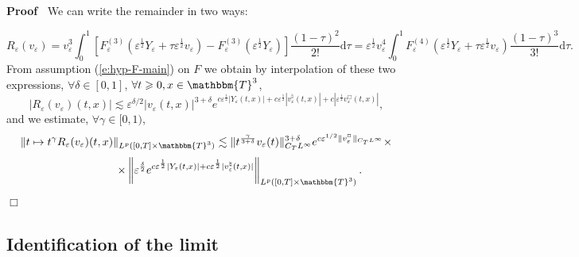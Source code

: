\documentclass[a4paper,11pt]{article}
\newcommand{\mathd}{\mathrm{d}}
\newenvironment{proof}{\noindent\textbf{Proof\ }}{\hspace*{\fill}$\Box$\medskip}
\begin{document}
\begin{proof}
  We can write the remainder in two ways:
  
  
  \[ R_{\varepsilon} (v_{\varepsilon}) = v_{\varepsilon}^3 \int_0^1
     [F_{\varepsilon}^{(3)} (\varepsilon^{\frac{1}{2}} Y_{\varepsilon} + \tau
     \varepsilon^{\frac{1}{2}} v_{\varepsilon}) - F_{\varepsilon}^{(3)}
     (\varepsilon^{\frac{1}{2}} Y_{\varepsilon})]  \frac{(1 - \tau)^2}{2!}
     \mathd \tau = \varepsilon^{\tfrac{1}{2}} v_{\varepsilon}^4 \int_0^1
     F_{\varepsilon}^{(4)} (\varepsilon^{\frac{1}{2}} Y_{\varepsilon} + \tau
     \varepsilon^{\frac{1}{2}} v_{\varepsilon})  \frac{(1 - \tau)^3}{3!}
     \mathd \tau . \]
  From assumption (\ref{e:hyp-F-main}) on $F$ we obtain by interpolation of
  these two expressions, $\forall \delta \in [0, 1]$, $\forall t \geqslant 0,
  x \in \mathbbm{T}^3$,
  \[ | R_{\varepsilon} (v_{\varepsilon}) (t, x) | \lesssim \varepsilon^{\delta
     / 2} | v_{\varepsilon} (t, x) |^{3 + \delta} e^{c
     \varepsilon^{\frac{1}{2}}  | Y_{\varepsilon} (t, x) | + c
     \varepsilon^{\frac{1}{2}} | v^{\natural}_{\varepsilon} (t, x) | + c |
     \varepsilon^{\frac{1}{2}} v^{\Box}_{\varepsilon} (t, x) |}, \]
  and we estimate, $\forall \gamma \in [0, 1)$,
  \[ \| t \mapsto t^{\gamma} R_{\varepsilon} (v_{\varepsilon}) (t, x) \|_{L^p ([0,T]\times \mathbbm{T}^3)} \lesssim \|t^{\frac{\gamma}{3 + \delta}}
     v_{\varepsilon} (t) \|_{C_T L^{\infty}}^{3 + \delta} e^{c \varepsilon^{1
     / 2} \|v^{\Box}_{\varepsilon} \|_{C_T L^{\infty}}} \times
     \] \[\qquad\qquad\qquad\times \left\|
     \varepsilon^{\frac{\delta}{2}} e^{c \varepsilon^{\frac{1}{2}}  |
     Y_{\varepsilon} (t, x) | + c \varepsilon^{\frac{1}{2}} |
     v^{\natural}_{\varepsilon} (t, x) |} \right\|_{L^p ([0,T]\times \mathbbm{T}^3)} . \]
\end{proof}

\subsection{Identification of the limit}\label{s:limit-ident}
\end{document}
